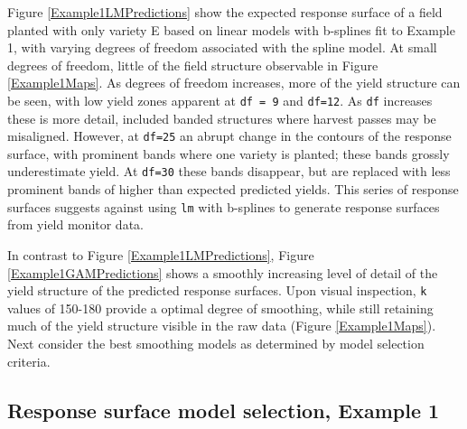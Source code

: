 \documentclass[phdcss]{SDSUThesis}
\begin{document}
Figure \ref{Example1LMPredictions} show the expected response surface of a field planted with only variety E based on linear models with b-splines fit to Example 1, with varying degrees of freedom associated with the spline model. At small degrees of freedom, little of the field structure observable in Figure \ref{Example1Maps}. As degrees of freedom increases, more of the yield structure can be seen, with low yield zones apparent at \texttt{df = 9} and  \texttt{df=12}. As \texttt{df} increases these is more detail, included banded structures where harvest passes may be misaligned. However, at \texttt{df=25} an abrupt change in the contours of the response surface, with prominent bands where one variety is planted; these bands grossly underestimate yield. At \texttt{df=30} these bands disappear, but are replaced with less prominent bands of higher than expected predicted yields. This series of response surfaces suggests against using \texttt{lm} with b-splines to generate response surfaces from yield monitor data.

In contrast to Figure \ref{Example1LMPredictions}, Figure \ref{Example1GAMPredictions} shows a smoothly increasing level of detail of the yield structure of the predicted response surfaces. Upon visual inspection, \texttt{k} values of 150-180 provide a optimal degree of smoothing, while still retaining much of the yield structure visible in the raw data (Figure \ref{Example1Maps}). Next consider the best smoothing models as determined by model selection criteria.



\subsection{Response surface model selection, Example 1}
\end{document}
